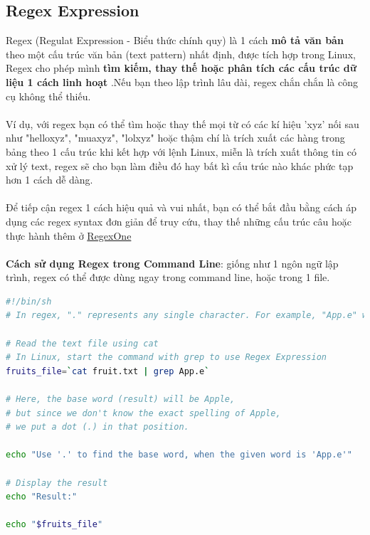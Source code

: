 \documentclass[11pt]{article}
\begin{document}
\subsection{Regex Expression}
Regex (Regulat Expression - Biểu thức chính quy) là 1 cách \textbf{mô tả văn bản} theo một cấu trúc văn bản (text pattern) nhất định, được tích hợp trong Linux, Regex cho phép mình \textbf{tìm kiếm, thay thế hoặc phân tích các cấu trúc dữ liệu 1 cách linh hoạt} .Nếu bạn theo lập trình lâu dài, regex chắn chắn là công cụ không thể thiếu. \\ \\
Ví dụ, với regex bạn có thể tìm hoặc thay thế mọi từ có các kí hiệu 'xyz' nối sau như "helloxyz", "muaxyz", "lolxyz" hoặc thậm chí là trích xuất các hàng trong bảng theo 1 cấu trúc khi kết hợp với lệnh Linux, miễn là trích xuất thông tin có xử lý text, regex sẽ cho bạn làm điều đó hay bất kì cấu trúc nào khác phức tạp hơn 1 cách dễ dàng. \\ \\
Để tiếp cận regex 1 cách hiệu quả và vui nhất, bạn có thể bắt đầu bằng cách áp dụng các regex syntax đơn giản để truy cứu, thay thế những cấu trúc câu hoặc thực hành thêm ở \href{https://regexone.com/}{RegexOne} \\ \\

\textbf{Cách sử dụng Regex trong Command Line}: giống như 1 ngôn ngữ lập trình, regex có thể được dùng ngay trong command line, hoặc trong 1 file.

\begin{tcolorbox}[colback=backcolour, colframe=black, title=Ví dụ: Sử dụng Regex với grep]
\begin{lstlisting}[language=bash]
#!/bin/sh
# In regex, "." represents any single character. For example, "App.e" will match "Apple", "Appie", "Appae", etc., as long as it starts with "App" and ends with "e".

# Read the text file using cat
# In Linux, start the command with grep to use Regex Expression
fruits_file=`cat fruit.txt | grep App.e`

# Here, the base word (result) will be Apple,
# but since we don't know the exact spelling of Apple,
# we put a dot (.) in that position.

echo "Use '.' to find the base word, when the given word is 'App.e'"

# Display the result
echo "Result:"

echo "$fruits_file"
\end{lstlisting}
\end{tcolorbox}
\end{document}
